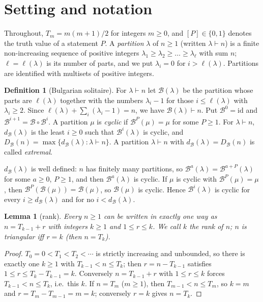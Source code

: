 \documentclass[11pt]{article}
\newtheorem{lemma}[theorem]{Lemma}
\theoremstyle{definition}
\newtheorem{definition}[theorem]{Definition}
\newcommand{\B}{\mathcal{B}}
\newcommand{\dB}{d_{\mathcal{B}}}
\newcommand{\DB}{D_{\mathcal{B}}}
\renewcommand{\le}{\leqslant}
\renewcommand{\ge}{\geqslant}
\begin{document}
\section{Setting and notation}\label{sec:defs}

Throughout, $T_m=m(m+1)/2$ for integers $m\ge 0$, and $[P]\in\{0,1\}$ denotes the truth value
of a statement $P$.
A \emph{partition} $\lambda$ of $n\ge 1$ (written $\lambda\vdash n$) is a finite non-increasing
sequence of positive integers $\lambda_1\ge\lambda_2\ge\dots\ge\lambda_\ell$ with sum $n$;
$\ell=\ell(\lambda)$ is its number of parts, and we put $\lambda_i=0$ for $i>\ell(\lambda)$.
Partitions are identified with multisets of positive integers.

\begin{definition}[Bulgarian solitaire]
For $\lambda\vdash n$ let $\B(\lambda)$ be the partition whose parts are $\ell(\lambda)$ together
with the numbers $\lambda_i-1$ for those $i\le\ell(\lambda)$ with $\lambda_i\ge 2$.
Since $\ell(\lambda)+\sum_{i}(\lambda_i-1)=n$, we have $\B(\lambda)\vdash n$.
Put $\B^0=\mathrm{id}$ and $\B^{i+1}=\B\circ\B^{i}$.
A partition $\mu$ is \emph{cyclic} if $\B^P(\mu)=\mu$ for some $P\ge 1$.
For $\lambda\vdash n$, $\dB(\lambda)$ is the least $i\ge 0$ such that $\B^i(\lambda)$ is cyclic,
and $\DB(n)=\max\{\dB(\lambda):\lambda\vdash n\}$.
A partition $\lambda\vdash n$ with $\dB(\lambda)=\DB(n)$ is called \emph{extremal}.
\end{definition}

$\dB(\lambda)$ is well defined: $n$ has finitely many partitions, so $\B^a(\lambda)=\B^{a+P}(\lambda)$
for some $a\ge 0$, $P\ge 1$, and then $\B^a(\lambda)$ is cyclic.
If $\mu$ is cyclic with $\B^P(\mu)=\mu$, then $\B^P(\B(\mu))=\B(\mu)$, so $\B(\mu)$ is cyclic.
Hence $\B^i(\lambda)$ is cyclic for every $i\ge\dB(\lambda)$ and for no $i<\dB(\lambda)$.

\begin{lemma}[rank]\label{lem:rank}
Every $n\ge1$ can be written in exactly one way as $n=T_{k-1}+r$ with integers $k\ge1$ and
$1\le r\le k$.  We call $k$ the \emph{rank} of $n$; $n$ is triangular iff $r=k$ (then $n=T_k$).
\end{lemma}
\begin{proof}
$T_0=0<T_1<T_2<\cdots$ is strictly increasing and unbounded, so there is exactly one $k\ge 1$ with
$T_{k-1}<n\le T_k$; then $r=n-T_{k-1}$ satisfies $1\le r\le T_k-T_{k-1}=k$.
Conversely $n=T_{k-1}+r$ with $1\le r\le k$ forces $T_{k-1}<n\le T_k$, i.e.\ this $k$.
If $n=T_m$ ($m\ge1$), then $T_{m-1}<n\le T_m$, so $k=m$ and $r=T_m-T_{m-1}=m=k$; conversely $r=k$ gives
$n=T_k$.
\end{proof}
\end{document}
